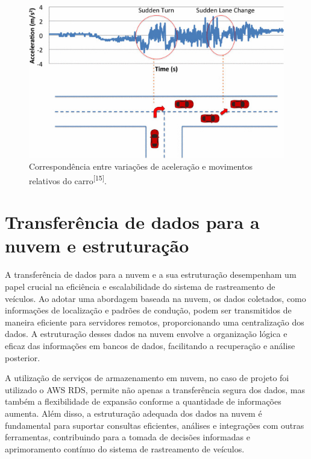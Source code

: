 \begin{figure}[hp]
    \centering
    
    \includegraphics[scale=0.6]{figures/sudden_acc_car.jpg}
    
    \caption{Correspondência entre variações de aceleração e movimentos relativos do carro\textsuperscript{[15]}.}
    
    \label{fig:sudden_acc_car}
\end{figure}

\section{Transferência de dados para a nuvem e estruturação}

A transferência de dados para a nuvem e a sua estruturação desempenham um papel crucial na eficiência e escalabilidade do sistema de rastreamento de veículos. Ao adotar uma abordagem baseada na nuvem, os dados coletados, como informações de localização e padrões de condução, podem ser transmitidos de maneira eficiente para servidores remotos, proporcionando uma centralização dos dados. A estruturação desses dados na nuvem envolve a organização lógica e eficaz das informações em bancos de dados, facilitando a recuperação e análise posterior. 

A utilização de serviços de armazenamento em nuvem, no caso de projeto foi utilizado o AWS RDS, permite não apenas a transferência segura dos dados, mas também a flexibilidade de expansão conforme a quantidade de informações aumenta. Além disso, a estruturação adequada dos dados na nuvem é fundamental para suportar consultas eficientes, análises e integrações com outras ferramentas, contribuindo para a tomada de decisões informadas e aprimoramento contínuo do sistema de rastreamento de veículos. 

